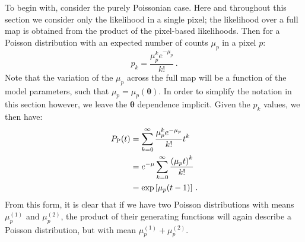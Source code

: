 To begin with, consider the purely Poissonian case. Here and throughout this section we consider only the likelihood in a single pixel; the likelihood over a full map is obtained from the product of the pixel-based likelihoods. Then for a Poisson distribution with an expected number of counts $\mu_p$ in a pixel $p$:
\begin{equation}
p_k = \frac{\mu_p^k e^{-\mu_p}}{k!}\,.
\end{equation}
Note that the variation of the $\mu_p$ across the full map will be a function of the model parameters, such that $\mu_p = \mu_p(\bm{\theta})$. In order to simplify the notation in this section however, we leave the $\bm{\theta}$ dependence implicit. Given the $p_k$ values, we then have:
\begin{equation}\begin{aligned}
P_{\rm P}(t) &= \sum_{k=0}^{\infty} \frac{\mu_p^k e^{-\mu_p}}{k!} t^k \\
&= e^{-\mu} \sum_{k=0}^{\infty} \frac{\left( \mu_p t \right)^k}{k!} \\
&= \exp \left[ \mu_p(t-1) \right]\,.
\label{eq:Pgen}
\end{aligned}\end{equation}
From this form, it is clear that if we have two Poisson distributions with means $\mu_p^{(1)}$ and $\mu_p^{(2)}$, the product of their generating functions will again describe a Poisson distribution, but with mean $\mu_p^{(1)} + \mu_p^{(2)}$.

